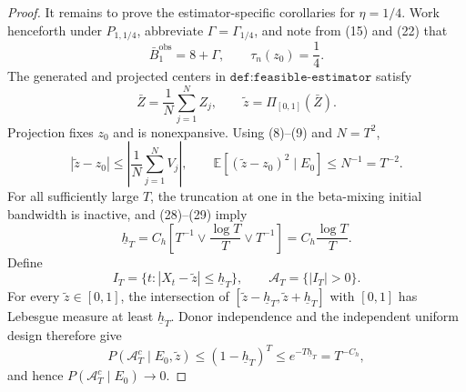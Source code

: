 \documentclass{article}
\begin{document}
\begin{proof}
It remains to prove the estimator-specific corollaries for \(\eta=1/4\).  Work henceforth under \(P_{1,1/4}\), abbreviate \(\Gamma=\Gamma_{1/4}\), and note from (15) and (22) that
\[
\bar B_1^{\mathrm{obs}}=8+\Gamma,
\qquad
\tau_n(z_0)=\frac14.
\tag{36}
\]
The generated and projected centers in \(\texttt{def:feasible-estimator}\) satisfy
\[
\bar Z=\frac1N\sum_{j=1}^{N}Z_j,
\qquad
\widetilde z=\Pi_{[0,1]}(\bar Z).
\tag{37}
\]
Projection fixes \(z_0\) and is nonexpansive.  Using (8)--(9) and \(N=T^2\),
\[
|\widetilde z-z_0|
\le\left|\frac1N\sum_{j=1}^{N}V_j\right|,
\qquad
\mathbb E[(\widetilde z-z_0)^2\mid E_0]
\le N^{-1}=T^{-2}.
\tag{38}
\]
For all sufficiently large \(T\), the truncation at one in the beta-mixing initial bandwidth is inactive, and (28)--(29) imply
\[
\underline h_T
=C_h\left[T^{-1}\vee\frac{\log T}{T}\vee T^{-1}\right]
=C_h\frac{\log T}{T}.
\tag{39}
\]
Define
\[
I_T=\{t:|X_t-\widetilde z|\le\underline h_T\},
\qquad
\mathcal A_T=\{|I_T|>0\}.
\tag{40}
\]
For every \(\widetilde z\in[0,1]\), the intersection of \([\widetilde z-\underline h_T,\widetilde z+\underline h_T]\) with \([0,1]\) has Lebesgue measure at least \(\underline h_T\).  Donor independence and the independent uniform design therefore give
\[
P(\mathcal A_T^c\mid E_0,\widetilde z)
\le(1-\underline h_T)^T
\le e^{-T\underline h_T}
=T^{-C_h},
\tag{41}
\]
and hence \(P(\mathcal A_T^c\mid E_0)\to0\).


\end{proof}
\end{document}
